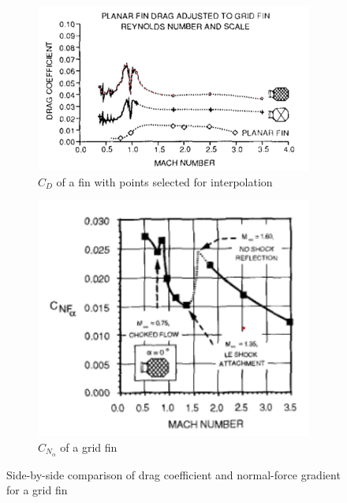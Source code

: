 \begin{figure}[H]
    \centering
    \begin{subfigure}[b]{0.48\linewidth}
        \centering
        \includegraphics[width=\linewidth]{figures/LiteratureStudy/GridFins/DragCoefficientInterpolation.png}
        \caption{$C_D$ of a fin with points selected for interpolation \cite{washington1993grid}}
        \label{fig:drag_coeff_grid}
    \end{subfigure}
    \hfill
    \begin{subfigure}[b]{0.48\linewidth}
        \centering
        \includegraphics[width=\linewidth]{figures/LiteratureStudy/GridFins/CNGalpha_GF.png}
        \caption{$C_{N_\alpha}$ of a grid fin \cite{washington1993grid}}
        \label{fig:cnalpha_grid}
    \end{subfigure}
    \caption{Side-by-side comparison of drag coefficient and normal-force gradient for a grid fin}
    \label{fig:gridfin_side_by_side}
\end{figure}

